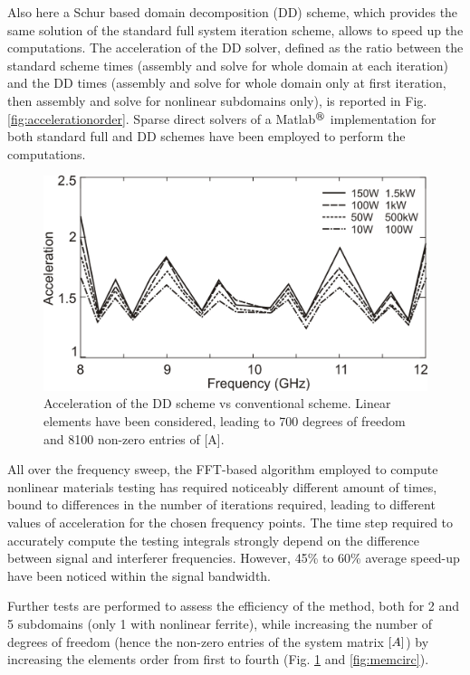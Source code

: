 Also here a Schur based domain decomposition (DD) scheme, which provides the same solution of the standard full system iteration scheme, allows to speed up the computations. The acceleration of the DD solver, defined as the ratio between the standard scheme times (assembly and solve for whole domain at each iteration) and the DD times (assembly and solve for whole domain only at first iteration, then assembly and solve for nonlinear subdomains only), is reported in Fig. \ref{fig:accelerationorder}. Sparse direct solvers of a Matlab${}^\text{\circledR}$ implementation for both standard full and DD schemes have been employed to perform the computations.
%
\begin{figure}[!ht]
\centering
\includegraphics[width=12cm]{acccirc}
\caption{Acceleration of the DD scheme vs conventional scheme. Linear elements have been considered,
leading to 700 degrees of freedom and 8100 non-zero entries of [A].}
\label{fig:acccirc}
\end{figure}
%
All over the frequency sweep, the FFT-based algorithm employed to compute nonlinear materials testing has
required noticeably different amount of times, bound to differences in the number of iterations required,
leading to different values of acceleration for the chosen frequency points. The time step required to
accurately compute the testing integrals strongly depend on the difference between signal and interferer
frequencies. However, 45\% to 60\% average speed-up have been noticed within the signal bandwidth.

Further tests are performed to assess the efficiency of the method, both for 2 and 5 subdomains (only 1 with
nonlinear ferrite), while increasing the number of degrees of freedom (hence the non-zero entries of the
system matrix $\left[A\right]$) by increasing the elements order from first to fourth (Fig. \ref{fig:acccirc} and \ref{fig:memcirc}).

